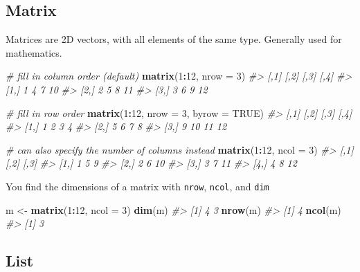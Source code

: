 \documentclass[]{book}
\newenvironment{Shaded}{\begin{snugshade}}{\end{snugshade}}
\newcommand{\CommentTok}[1]{\textcolor[rgb]{0.56,0.35,0.01}{\textit{#1}}}
\newcommand{\DataTypeTok}[1]{\textcolor[rgb]{0.13,0.29,0.53}{#1}}
\newcommand{\DecValTok}[1]{\textcolor[rgb]{0.00,0.00,0.81}{#1}}
\newcommand{\KeywordTok}[1]{\textcolor[rgb]{0.13,0.29,0.53}{\textbf{#1}}}
\newcommand{\NormalTok}[1]{#1}
\newcommand{\OperatorTok}[1]{\textcolor[rgb]{0.81,0.36,0.00}{\textbf{#1}}}
\newcommand{\OtherTok}[1]{\textcolor[rgb]{0.56,0.35,0.01}{#1}}
\newcommand{\StringTok}[1]{\textcolor[rgb]{0.31,0.60,0.02}{#1}}
\theoremstyle{definition}
\theoremstyle{definition}
\theoremstyle{definition}
\theoremstyle{remark}
\begin{document}
\hypertarget{matrix}{%
\subsection{Matrix}\label{matrix}}

Matrices are 2D vectors, with all elements of the same type. Generally
used for mathematics.

\begin{Shaded}
\begin{Highlighting}[]
\CommentTok{# fill in column order (default)}
\KeywordTok{matrix}\NormalTok{(}\DecValTok{1}\OperatorTok{:}\DecValTok{12}\NormalTok{, }\DataTypeTok{nrow =} \DecValTok{3}\NormalTok{)}
\CommentTok{#>      [,1] [,2] [,3] [,4]}
\CommentTok{#> [1,]    1    4    7   10}
\CommentTok{#> [2,]    2    5    8   11}
\CommentTok{#> [3,]    3    6    9   12}

\CommentTok{# fill in row order}
\KeywordTok{matrix}\NormalTok{(}\DecValTok{1}\OperatorTok{:}\DecValTok{12}\NormalTok{, }\DataTypeTok{nrow =} \DecValTok{3}\NormalTok{, }\DataTypeTok{byrow =} \OtherTok{TRUE}\NormalTok{)}
\CommentTok{#>      [,1] [,2] [,3] [,4]}
\CommentTok{#> [1,]    1    2    3    4}
\CommentTok{#> [2,]    5    6    7    8}
\CommentTok{#> [3,]    9   10   11   12}

\CommentTok{# can also specify the number of columns instead}
\KeywordTok{matrix}\NormalTok{(}\DecValTok{1}\OperatorTok{:}\DecValTok{12}\NormalTok{, }\DataTypeTok{ncol =} \DecValTok{3}\NormalTok{)}
\CommentTok{#>      [,1] [,2] [,3]}
\CommentTok{#> [1,]    1    5    9}
\CommentTok{#> [2,]    2    6   10}
\CommentTok{#> [3,]    3    7   11}
\CommentTok{#> [4,]    4    8   12}
\end{Highlighting}
\end{Shaded}

You find the dimensions of a matrix with \texttt{nrow}, \texttt{ncol},
and \texttt{dim}

\begin{Shaded}
\begin{Highlighting}[]
\NormalTok{m <-}\StringTok{ }\KeywordTok{matrix}\NormalTok{(}\DecValTok{1}\OperatorTok{:}\DecValTok{12}\NormalTok{, }\DataTypeTok{ncol =} \DecValTok{3}\NormalTok{)}
\KeywordTok{dim}\NormalTok{(m)}
\CommentTok{#> [1] 4 3}
\KeywordTok{nrow}\NormalTok{(m)}
\CommentTok{#> [1] 4}
\KeywordTok{ncol}\NormalTok{(m)}
\CommentTok{#> [1] 3}
\end{Highlighting}
\end{Shaded}

\hypertarget{list}{%
\subsection{List}\label{list}}
\end{document}
